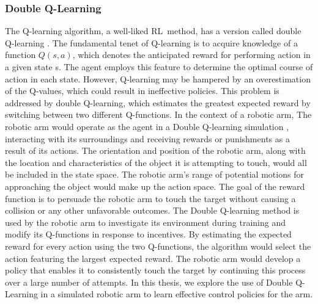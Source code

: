 \documentclass[12pt,oneside]{article}
\begin{document}
\subsubsection{Double Q-Learning}
The Q-learning algorithm, a well-liked RL method, has a version called double Q-learning \cite{33_ogunniyi2014energy}. The fundamental tenet of Q-learning is to acquire knowledge of a function $Q(s,a)$, which denotes the anticipated reward for performing action in a given state s. The agent employs this feature to determine the optimal course of action in each state. However, Q-learning may be hampered by an overestimation of the Q-values, which could result in ineffective policies. This problem is addressed by double Q-learning, which estimates the greatest expected reward by switching between two different Q-functions.
In the context of a robotic arm, The robotic arm would operate as the agent in a Double Q-learning simulation \cite{34_weng2020mean}, interacting with its surroundings and receiving rewards or punishments as a result of its actions. The orientation and position of the robotic arm, along with the location and characteristics of the object it is attempting to touch, would all be included in the state space. The robotic arm's range of potential motions for approaching the object would make up the action space. The goal of the reward function is to persuade the robotic arm to touch the target without causing a collision or any other unfavorable outcomes.
The Double Q-learning method is used by the robotic arm to investigate its environment during training and modify its Q-functions in response to incentives. By estimating the expected reward for every action using the two Q-functions, the algorithm would select the action featuring the largest expected reward. The robotic arm would develop a policy that enables it to consistently touch the target by continuing this process over a large number of attempts. In this thesis, we explore the use of Double Q-Learning in a simulated robotic arm to learn effective control policies for the arm.
\end{document}
